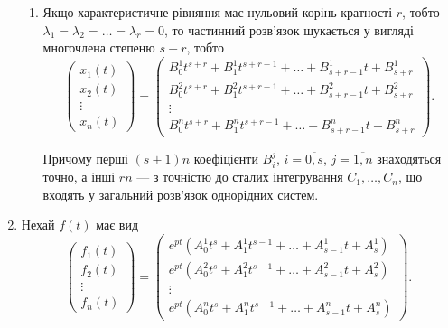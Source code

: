 \begin{enumerate}
\begin{enumerate}
		\item Якщо характеристичне рівняння має нульовий корінь кратності $r$, тобто $\lambda_1 = \lambda_2 = \ldots = \lambda_r = 0$, то частинний розв'язок шукається у вигляді многочлена степеню $s + r$, тобто
		\begin{equation*}
			\begin{pmatrix} x_1(t) \\ x_2(t) \\ \vdots \\ x_n(t) \end{pmatrix} =
			\begin{pmatrix} B_0^1 t^{s + r} + B_1^1 t^{s + r - 1} + \ldots + B_{s + r - 1}^1 t + B_{s + r}^1 \\ B_0^2 t^{s + r} + B_1^2 t^{s + r - 1} + \ldots + B_{s + r - 1}^2 t + B_{s + r}^2 \\ \vdots \\ B_0^n t^{s + r} + B_1^n t^{s + r - 1} + \ldots + B_{s + r - 1}^n t + B_{s + r}^n \end{pmatrix}.
		\end{equation*}

		Причому перші $(s + 1) n$ коефіцієнти $B_i^j$, $i = \overline{0, s}$, $j = \overline{1, n}$ знаходяться точно, а інші $r n$ --- з точністю до сталих інтегрування $C_1, \ldots, C_n$, що входять у загальний розв'язок однорідних систем.
	\end{enumerate}

	\item Нехай $f(t)$ має вид
	\begin{equation*}
		\begin{pmatrix} f_1(t) \\ f_2(t) \\ \vdots \\ f_n(t) \end{pmatrix} =
		\begin{pmatrix} e^{pt} (A_0^1 t^s + A_1^1 t^{s - 1} + \ldots + A_{s - 1}^1 t + A_s^1) \\ e^{pt} (A_0^2 t^s + A_1^2 t^{s - 1} + \ldots + A_{s - 1}^2 t + A_s^2) \\ \vdots \\ e^{pt} (A_0^n t^s + A_1^n t^{s - 1} + \ldots + A_{s - 1}^n t + A_s^n) \end{pmatrix}.
	\end{equation*}


\end{enumerate}
